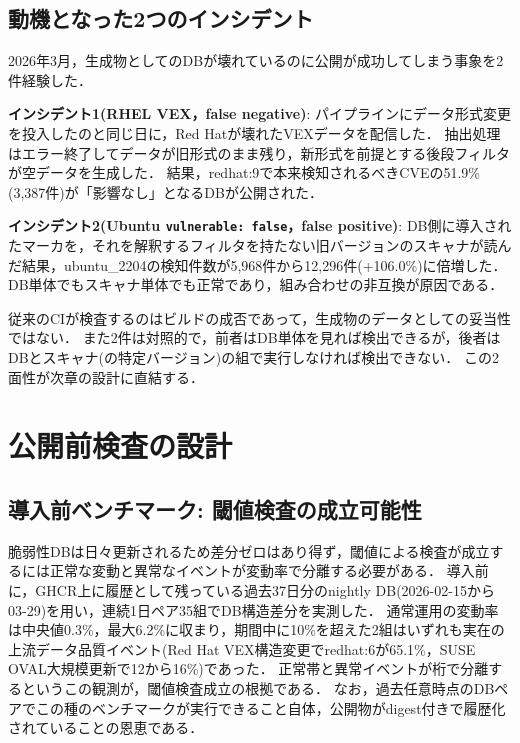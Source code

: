 \documentclass{css}
\begin{document}
\subsection{動機となった2つのインシデント}
\label{sec:incidents}

2026年3月，生成物としてのDBが壊れているのに公開が成功してしまう事象を2件経験した．

\textbf{インシデント1(RHEL VEX，false negative)}:
パイプラインにデータ形式変更を投入したのと同じ日に，Red Hatが壊れたVEXデータを配信した．
抽出処理はエラー終了してデータが旧形式のまま残り，新形式を前提とする後段フィルタが空データを生成した．
結果，redhat:9で本来検知されるべきCVEの51.9\%(3,387件)が「影響なし」となるDBが公開された．

\textbf{インシデント2(Ubuntu \texttt{vulnerable: false}，false positive)}:
DB側に導入されたマーカを，それを解釈するフィルタを持たない旧バージョンのスキャナが読んだ結果，ubuntu\_2204の検知件数が5,968件から12,296件(+106.0\%)に倍増した．
DB単体でもスキャナ単体でも正常であり，組み合わせの非互換が原因である．

従来のCIが検査するのはビルドの成否であって，生成物のデータとしての妥当性ではない．
また2件は対照的で，前者はDB単体を見れば検出できるが，後者はDBとスキャナ(の特定バージョン)の組で実行しなければ検出できない．
この2面性が次章の設計に直結する．

\section{公開前検査の設計}
\label{sec:design}

\subsection{導入前ベンチマーク: 閾値検査の成立可能性}
\label{sec:benchmark}

脆弱性DBは日々更新されるため差分ゼロはあり得ず，閾値による検査が成立するには正常な変動と異常なイベントが変動率で分離する必要がある．
導入前に，GHCR上に履歴として残っている過去37日分のnightly DB(2026-02-15から03-29)を用い，連続1日ペア35組でDB構造差分を実測した．
通常運用の変動率は中央値0.3\%，最大6.2\%に収まり，期間中に10\%を超えた2組はいずれも実在の上流データ品質イベント(Red Hat VEX構造変更でredhat:6が65.1\%，SUSE OVAL大規模更新で12から16\%)であった．
正常帯と異常イベントが桁で分離するというこの観測が，閾値検査成立の根拠である．
なお，過去任意時点のDBペアでこの種のベンチマークが実行できること自体，公開物がdigest付きで履歴化されている\cite{nakaoka2025}ことの恩恵である．
\end{document}
